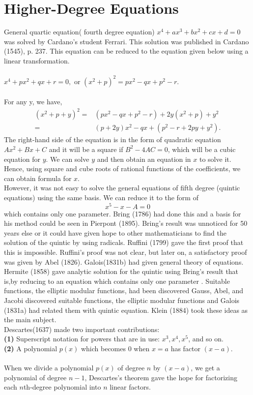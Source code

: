 \documentclass[a4paper,reqno,11pt]{book}
\theoremstyle{plain}%
\theoremstyle{definition}
\begin{document}
\section{Higher-Degree Equations}
General quartic equation( fourth degree equation)
$x^4 + ax^3 + bx^2 + cx + d = 0$
was solved by Cardano’s student Ferrari. This solution was published
in Cardano (1545), p. 237. This equation can be reduced to the equation given below using a linear transformation.\\
\\
$x^4 + px^2 + qx + r = 0,$  or  $(x^2+p)^2 = px^2 - qx + p^2 - r.$\\
\\
For any y, we have,
\begin{align*}
(x^2 + p + y)^2 =& (px^2 − qx + p^2 − r) + 2y(x^2 + p) + y^2\\
=& (p + 2y)x^2 − qx + (p^2 − r + 2py + y^2).
\end{align*}
The right-hand side of the equation is in the form of quadratic equation $Ax^2 + Bx + C$ and it will be a square if $B^2 - 4AC = 0$, which will be a cubic equation for $y$. We can solve $y$ and then obtain an equation in $x$ to solve it. Hence, using square and cube roots of rational functions of the coefficients, we can obtain formula for $x$.\\
\indent However, it was not easy to solve the general equations of fifth degree (quintic equations) using the same basis. We can reduce it to the form of
$$x^5 - x - A = 0$$
which contains only one parameter. Bring (1786) had done this and a basis for
his method could be seen in Pierpont (1895). Bring’s result was unnoticed for 50 years else  or it could have given hope to other mathematicians to find the solution of the quintic by using radicals.
Ruffini (1799) gave the first proof that this is impossible. Ruffini’s proof
was not clear, but later on, a satisfactory proof was given by Abel (1826). Galois(1831b) had given general theory of equations.\\
\indent Hermite (1858) gave analytic solution for the quintic using Bring's result that is,by reducing to an equation which contains only one parameter . Suitable functions, the elliptic modular functions, had been discovered Gauss, Abel, and Jacobi discovered suitable functions, the elliptic modular functions and Galois (1831a) had related them with quintic equation. Klein (1884) took these ideas as the main subject.\\
\indent Descartes(1637) made two important contributions:\\
\textbf{(1)} Superscript notation for powers that are in use: $x^3, x^4, x^5$, and so on.\\ \textbf{(2)} A polynomial $p(x)$ which becomes 0 when $x = a$ has factor $(x - a)$.\\
\\When we divide a polynomial $p(x)$ of degree $n$ by $(x - a)$, we get a polynomial of degree $n-1$, Descartes’s theorem gave the hope for
factorizing each $n$th-degree polynomial into $n$ linear factors.\\
\\
\end{document}
